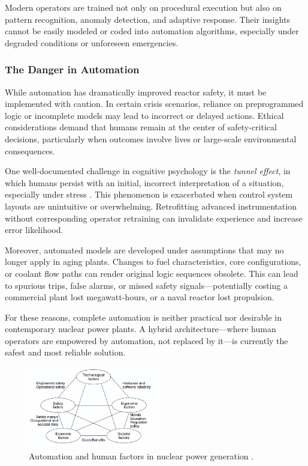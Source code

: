 \documentclass[12pt]{article}
\begin{document}
Modern operators are trained not only on procedural execution but also on pattern recognition, anomaly detection, and adaptive response. Their insights cannot be easily modeled or coded into automation algorithms, especially under degraded conditions or unforeseen emergencies.

\subsubsection*{The Danger in Automation}
While automation has dramatically improved reactor safety, it must be implemented with caution. In certain crisis scenarios, reliance on preprogrammed logic or incomplete models may lead to incorrect or delayed actions. Ethical considerations demand that humans remain at the center of safety-critical decisions, particularly when outcomes involve lives or large-scale environmental consequences.

One well-documented challenge in cognitive psychology is the \textit{tunnel effect}, in which humans persist with an initial, incorrect interpretation of a situation, especially under stress \autocite{moderninstruments}. This phenomenon is exacerbated when control system layouts are unintuitive or overwhelming. Retrofitting advanced instrumentation without corresponding operator retraining can invalidate experience and increase error likelihood.

Moreover, automated models are developed under assumptions that may no longer apply in aging plants. Changes to fuel characteristics, core configurations, or coolant flow paths can render original logic sequences obsolete. This can lead to spurious trips, false alarms, or missed safety signals—potentially costing a commercial plant lost megawatt-hours, or a naval reactor lost propulsion.

For these reasons, complete automation is neither practical nor desirable in contemporary nuclear power plants. A hybrid architecture—where human operators are empowered by automation, not replaced by it—is currently the safest and most reliable solution.

\begin{figure}[H]
  \centering
  \includegraphics[width=0.5\textwidth]{automationfactors}
  \caption{Automation and human factors in nuclear power generation \autocite{moderninstruments}.}
  \label{fig:automationfactors}
\end{figure}
\end{document}
